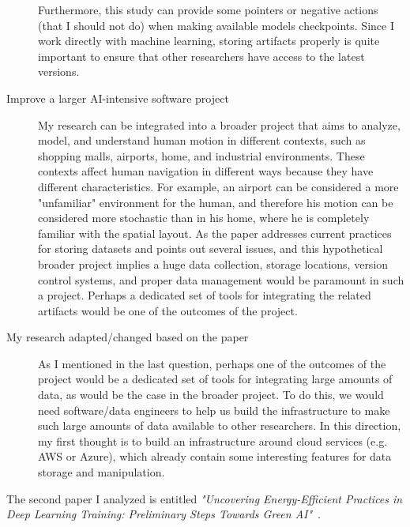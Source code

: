 \documentclass{article}
\begin{document}
\begin{description}
    Furthermore, this study can provide some pointers or negative actions (that I should not do) when making available models checkpoints. Since I work directly with machine learning, storing artifacts properly is quite important to ensure that other researchers have access to the latest versions.

    \item[Improve a larger AI-intensive software project] My research can be integrated into a broader project that aims to analyze, model, and understand human motion in different contexts, such as shopping malls, airports, home, and industrial environments. These contexts affect human navigation in different ways because they have different characteristics. For example, an airport can be considered a more "unfamiliar" environment for the human, and therefore his motion can be considered more stochastic than in his home, where he is completely familiar with the spatial layout. As the paper addresses current practices for storing datasets and points out several issues, and this hypothetical broader project implies a huge data collection, storage locations, version control systems, and proper data management would be paramount in such a project. Perhaps a dedicated set of tools for integrating the related artifacts would be one of the outcomes of the project.

    \item[My research adapted/changed based on the paper] As I mentioned in the last question, perhaps one of the outcomes of the project would be a dedicated set of tools for integrating large amounts of data, as would be the case in the broader project. To do this, we would need software/data engineers to help us build the infrastructure to make such large amounts of data available to other researchers. In this direction, my first thought is to build an infrastructure around cloud services (e.g. AWS or Azure), which already contain some interesting features for data storage and manipulation.
\end{description}


The second paper I analyzed is entitled \emph{"Uncovering Energy-Efficient Practices in Deep Learning Training: Preliminary Steps Towards Green AI"}~\cite{yarally23}.
\end{document}
